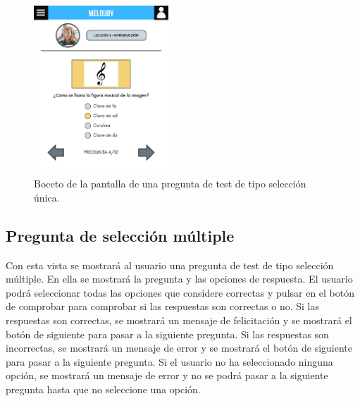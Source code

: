 \begin{figure}[H]
    \centering
    \centerline{\includegraphics[width=0.45\textwidth, frame]{imagenes/c6/5.png}}
    \caption{Boceto de la pantalla de una pregunta de test de tipo selección única.}
    \label{fig:seleccionunica}
\end{figure}

\newpage

\subsection*{Pregunta de selección múltiple}

Con esta vista se mostrará al usuario una pregunta de test de tipo selección múltiple. En ella se mostrará la pregunta y las opciones de respuesta. El usuario podrá seleccionar todas las opciones que considere correctas y pulsar en el botón de comprobar para comprobar si las respuestas son correctas o no. Si las respuestas son correctas, se mostrará un mensaje de felicitación y se mostrará el botón de siguiente para pasar a la siguiente pregunta. Si las respuestas son incorrectas, se mostrará un mensaje de error y se mostrará el botón de siguiente para pasar a la siguiente pregunta. Si el usuario no ha seleccionado ninguna opción, se mostrará un mensaje de error y no se podrá pasar a la siguiente pregunta hasta que no seleccione una opción.

